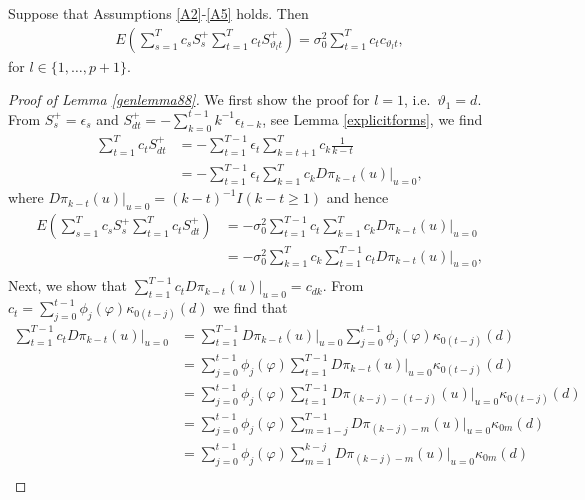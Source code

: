 {{\begin{lemma} \label{genlemma88} Suppose that Assumptions \ref{A2}-\ref{A5} holds. Then 
\begin{align*}
   E\left( \sum_{s = 1}^T  c_{s} S_{s}^+ \sum_{t = 1}^T c_{t} S_{\vartheta_l t}^+ \right) = \sigma_0^2 \sum_{t = 1}^T  c_{t} c_{\vartheta_l t},
\end{align*}
for $l \in \{1,\ldots,p+1 \}$. 
\end{lemma}
\begin{proof}[Proof of Lemma \ref{genlemma88}]
We first show the proof for $l = 1$, i.e.\ $\vartheta_1 = d$. From $S_{s}^+= \epsilon_s $ and $S_{d t}^+ =  -\sum_{k = 0}^{t-1} k^{-1}  \epsilon_{t-k} $, see Lemma \ref{explicitforms}, we find 
\begin{align*}
    \sum_{t = 1}^T  c_{t} S_{d t}^+  &= - \sum_{t = 1}^{T-1} \epsilon_t \sum_{k = t + 1}^T  c_{k} \frac{1}{k-t} \\
    &= - \sum_{t = 1}^{T-1} \epsilon_t \sum_{k = 1}^T c_{k} D\pi_{k-t}(u)|_{u = 0} , 
\end{align*}
where  $D\pi_{k-t}(u)|_{u = 0} = (k-t)^{-1} I(k-t \geq 1)$ and hence 
\begin{align*}
E(\sum_{s = 1}^T  c_{s} S_{s}^+ \sum_{t = 1}^T  c_{t} S_{dt}^+) &= - \sigma^2_0 \sum_{t = 1}^{T-1} c_{t}\sum_{k = 1}^T c_{k} D\pi_{k-t}(u)|_{u = 0} \\
&=  - \sigma^2_0 \sum_{k = 1}^T c_{k}  \sum_{t = 1}^{T-1}  c_{t} D\pi_{k-t}(u)|_{u = 0},  \\
\end{align*}
Next, we show that $\sum_{t = 1}^{T-1}  c_{t} D\pi_{k-t}(u)|_{u = 0} = c_{dk}$. From $c_{t}= \sum_{j = 0}^{t-1} \phi_j(\varphi) \kappa_{0(t-j)}(d)$ we find that 
\begin{align*}
     \sum_{t = 1}^{T-1} c_{t} D\pi_{k-t}(u)|_{u = 0} &= \sum_{t = 1}^{T-1} D\pi_{k-t}(u)|_{u = 0} \sum_{j = 0}^{t-1} \phi_j(\varphi) \kappa_{0(t-j)}(d) \\
     &= \sum_{j = 0}^{t-1} \phi_j(\varphi)  \sum_{t = 1}^{T-1} D\pi_{k-t}(u)|_{u = 0}\kappa_{0(t-j)}(d) \\
    &= \sum_{j = 0}^{t-1} \phi_j(\varphi)  \sum_{t = 1}^{T-1} D\pi_{(k-j)-(t-j)}(u)|_{u = 0}\kappa_{0(t-j)}(d) \\
    &= \sum_{j = 0}^{t-1} \phi_j(\varphi)  \sum_{m = 1-j}^{T-1} D\pi_{(k-j)-m}(u)|_{u = 0}\kappa_{0m}(d) \\
    &= \sum_{j = 0}^{t-1} \phi_j(\varphi)  \sum_{m = 1}^{k-j} D\pi_{(k-j)-m}(u)|_{u = 0}\kappa_{0m}(d) \\     

\end{align*}
\end{proof}}}

